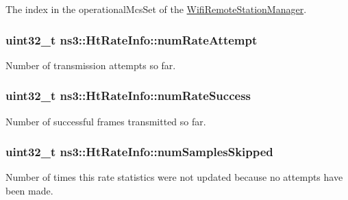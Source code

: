 The index in the operational\+Mcs\+Set of the \hyperlink{classns3_1_1WifiRemoteStationManager}{Wifi\+Remote\+Station\+Manager}. 

\subsubsection[{\texorpdfstring{num\+Rate\+Attempt}{numRateAttempt}}]{\setlength{\rightskip}{0pt plus 5cm}uint32\+\_\+t ns3\+::\+Ht\+Rate\+Info\+::num\+Rate\+Attempt}\hypertarget{structns3_1_1HtRateInfo_aeb81fc5eafcf17e4b766995caf53ba99}{}\label{structns3_1_1HtRateInfo_aeb81fc5eafcf17e4b766995caf53ba99}


Number of transmission attempts so far. 

\subsubsection[{\texorpdfstring{num\+Rate\+Success}{numRateSuccess}}]{\setlength{\rightskip}{0pt plus 5cm}uint32\+\_\+t ns3\+::\+Ht\+Rate\+Info\+::num\+Rate\+Success}\hypertarget{structns3_1_1HtRateInfo_a04d577e09bdf8fdd602f1dfba8f126c5}{}\label{structns3_1_1HtRateInfo_a04d577e09bdf8fdd602f1dfba8f126c5}


Number of successful frames transmitted so far. 

\subsubsection[{\texorpdfstring{num\+Samples\+Skipped}{numSamplesSkipped}}]{\setlength{\rightskip}{0pt plus 5cm}uint32\+\_\+t ns3\+::\+Ht\+Rate\+Info\+::num\+Samples\+Skipped}\hypertarget{structns3_1_1HtRateInfo_a0738e1ba583c6e4058861389e715e03a}{}\label{structns3_1_1HtRateInfo_a0738e1ba583c6e4058861389e715e03a}


Number of times this rate statistics were not updated because no attempts have been made. 

